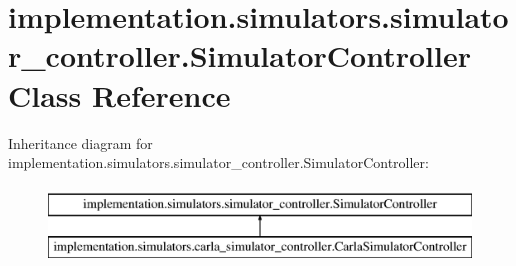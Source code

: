 \hypertarget{classimplementation_1_1simulators_1_1simulator__controller_1_1_simulator_controller}{}\section{implementation.\+simulators.\+simulator\+\_\+controller.\+Simulator\+Controller Class Reference}
\label{classimplementation_1_1simulators_1_1simulator__controller_1_1_simulator_controller}
Inheritance diagram for implementation.\+simulators.\+simulator\+\_\+controller.\+Simulator\+Controller\+:\begin{figure}[H]
\begin{center}
\leavevmode
\includegraphics[height=2.000000cm]{classimplementation_1_1simulators_1_1simulator__controller_1_1_simulator_controller}
\end{center}
\end{figure}
